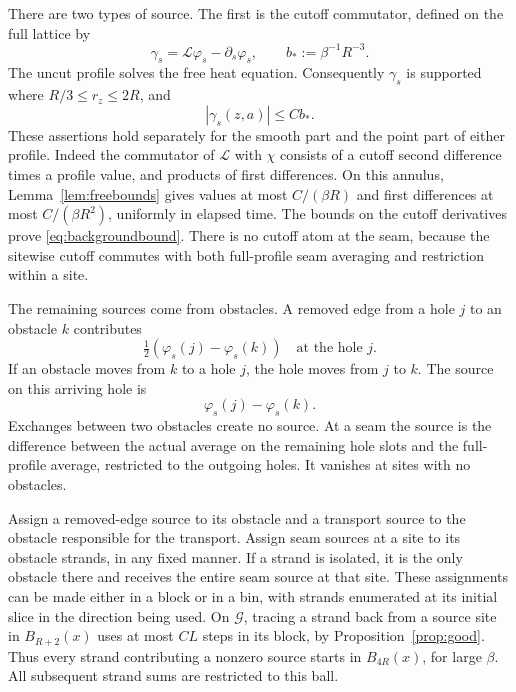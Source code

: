 There are two types of source.  The first is the cutoff commutator,
defined on the full lattice by
\begin{equation}\label{eq:backgroundsource}
 \gamma_s=\mathscr L\varphi_s-\partial_s\varphi_s,
 \qquad b_*:=\beta^{-1}R^{-3}.
\end{equation}
The uncut profile solves the free heat equation.  Consequently
$\gamma_s$ is supported where $R/3\le r_z\le2R$, and
\begin{equation}\label{eq:backgroundbound}
 |\gamma_s(z,a)|\le Cb_*.
\end{equation}
These assertions hold separately for the smooth part and the point
part of either profile.  Indeed the commutator of $\mathscr L$ with
$\chi$ consists of a cutoff second difference times a profile value,
and products of first differences.  On this annulus,
Lemma~\ref{lem:freebounds} gives values at most $C/(\beta R)$ and
first differences at most $C/(\beta R^2)$, uniformly in elapsed time.
The bounds on the cutoff derivatives prove
\eqref{eq:backgroundbound}.  There is no cutoff atom at the seam,
because the sitewise cutoff commutes with both full-profile seam
averaging and restriction within a site.

The remaining sources come from obstacles.  A removed edge from a
hole $j$ to an obstacle $k$ contributes
\begin{equation}\label{eq:removed-edge-source}
 \tfrac12(\varphi_s(j)-\varphi_s(k))
 \quad\text{at the hole }j.
\end{equation}
If an obstacle moves from $k$ to a hole $j$, the hole moves from $j$
to $k$.  The source on this arriving hole is
\begin{equation}\label{eq:transport-source}
 \varphi_s(j)-\varphi_s(k).
\end{equation}
Exchanges between two obstacles create no source.  At a seam the
source is the difference between the actual average on the remaining
hole slots and the full-profile average, restricted to the outgoing
holes.  It vanishes at sites with no obstacles.

Assign a removed-edge source to its obstacle and a transport source
to the obstacle responsible for the transport.  Assign seam sources
at a site to its obstacle strands, in any fixed manner.  If a strand
is isolated, it is the only obstacle there and receives the entire
seam source at that site.  These assignments can be made either in
a block or in a bin, with strands enumerated at its initial slice
in the direction being used.
On $\mathcal G$, tracing a strand back from a source site in
$B_{R+2}(x)$ uses at most $CL$ steps in its block, by
Proposition~\ref{prop:good}.  Thus every strand contributing a
nonzero source starts in $B_{4R}(x)$, for large $\beta$.
All subsequent strand sums are restricted to this ball.

